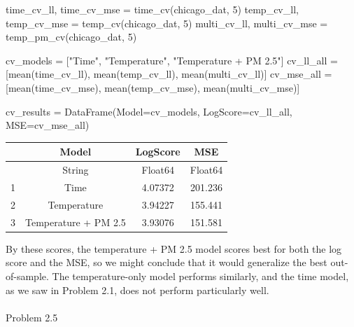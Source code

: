 \documentclass[
  letterpaper,
  DIV=11,
  numbers=noendperiod]{scrartcl}
\makeatletter
\let\oldparagraph\paragraph
\renewcommand{\paragraph}{
    \@ifstar
      \xxxParagraphStar
      \xxxParagraphNoStar
  }
\newcommand{\xxxParagraphStar}[1]{\oldparagraph*{#1}\mbox{}}
\newcommand{\xxxParagraphNoStar}[1]{\oldparagraph{#1}\mbox{}}
\newenvironment{Shaded}{\begin{snugshade}}{\end{snugshade}}
\newcommand{\FloatTok}[1]{\textcolor[rgb]{0.68,0.00,0.00}{#1}}
\newcommand{\FunctionTok}[1]{\textcolor[rgb]{0.28,0.35,0.67}{#1}}
\newcommand{\NormalTok}[1]{\textcolor[rgb]{0.00,0.23,0.31}{#1}}
\newcommand{\OperatorTok}[1]{\textcolor[rgb]{0.37,0.37,0.37}{#1}}
\newcommand{\StringTok}[1]{\textcolor[rgb]{0.13,0.47,0.30}{#1}}
\makeatother
\begin{document}
\begin{Shaded}
\begin{Highlighting}[]
\NormalTok{time\_cv\_ll, time\_cv\_mse }\OperatorTok{=} \FunctionTok{time\_cv}\NormalTok{(chicago\_dat, }\FloatTok{5}\NormalTok{)}
\NormalTok{temp\_cv\_ll, temp\_cv\_mse }\OperatorTok{=} \FunctionTok{temp\_cv}\NormalTok{(chicago\_dat, }\FloatTok{5}\NormalTok{)}
\NormalTok{multi\_cv\_ll, multi\_cv\_mse }\OperatorTok{=} \FunctionTok{temp\_pm\_cv}\NormalTok{(chicago\_dat, }\FloatTok{5}\NormalTok{)}

\NormalTok{cv\_models }\OperatorTok{=}\NormalTok{ [}\StringTok{"Time"}\NormalTok{, }\StringTok{"Temperature"}\NormalTok{, }\StringTok{"Temperature + PM 2.5"}\NormalTok{]}
\NormalTok{cv\_ll\_all }\OperatorTok{=}\NormalTok{ [}\FunctionTok{mean}\NormalTok{(time\_cv\_ll), }\FunctionTok{mean}\NormalTok{(temp\_cv\_ll), }\FunctionTok{mean}\NormalTok{(multi\_cv\_ll)]}
\NormalTok{cv\_mse\_all }\OperatorTok{=}\NormalTok{ [}\FunctionTok{mean}\NormalTok{(time\_cv\_mse), }\FunctionTok{mean}\NormalTok{(temp\_cv\_mse), }\FunctionTok{mean}\NormalTok{(multi\_cv\_mse)]}

\NormalTok{cv\_results }\OperatorTok{=} \FunctionTok{DataFrame}\NormalTok{(Model}\OperatorTok{=}\NormalTok{cv\_models, LogScore}\OperatorTok{=}\NormalTok{cv\_ll\_all, MSE}\OperatorTok{=}\NormalTok{cv\_mse\_all)}
\end{Highlighting}
\end{Shaded}

\begin{tabular}{r|ccc}
    & Model & LogScore & MSE\\
    \hline
    & String & Float64 & Float64\\
    \hline
    1 & Time & 4.07372 & 201.236 \\
    2 & Temperature & 3.94227 & 155.441 \\
    3 & Temperature + PM 2.5 & 3.93076 & 151.581 \\
\end{tabular}

By these scores, the temperature + PM 2.5 model scores best for both the
log score and the MSE, so we might conclude that it would generalize the
best out-of-sample. The temperature-only model performs similarly, and
the time model, as we saw in Problem 2.1, does not perform particularly
well.

\paragraph{Problem 2.5}\label{problem-2.5}
\end{document}
